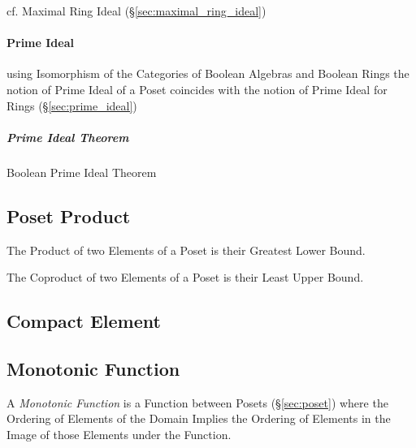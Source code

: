 cf. Maximal Ring Ideal (\S\ref{sec:maximal_ring_ideal})



\paragraph{Prime Ideal}\label{sec:order_prime_ideal}\hfill

\fist using Isomorphism of the Categories of Boolean Algebras and Boolean Rings
the notion of Prime Ideal of a Poset coincides with the notion of Prime Ideal
for Rings (\S\ref{sec:prime_ideal})



\subparagraph{Prime Ideal Theorem}\label{sec:prime_ideal_theorem}\hfill

Boolean Prime Ideal Theorem



\subsection{Poset Product}\label{sec:poset_product}

The Product of two Elements of a Poset is their Greatest Lower Bound.

The Coproduct of two Elements of a Poset is their Least Upper Bound.



\subsection{Compact Element}\label{sec:compact_element}

\subsection{Monotonic Function}\label{sec:monotonic_function}

A \emph{Monotonic Function} is a Function between Posets (\S\ref{sec:poset})
where the Ordering of Elements of the Domain Implies the Ordering of Elements in
the Image of those Elements under the Function.



